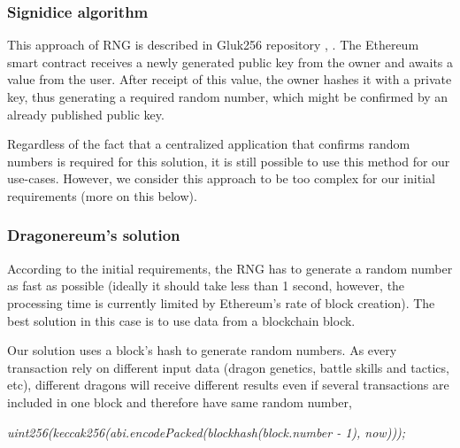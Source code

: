 \documentclass[12pt]{article}
\begin{document}
\vspace{\baselineskip}
\subsubsection{Signidice algorithm}\label{Signidice algorithm}  \par

This approach of RNG is described in Gluk256 repository  \cite{Dao_Casino_Ksenya_Serova_2017_Jun_27},  \cite{Gluk256_2016_Aug_26}. The Ethereum smart contract receives a newly generated public key from the owner and awaits a value from the user. After receipt of this value, the owner hashes it with a private key, thus generating a required random number, which might be confirmed by an already published public key.\par

Regardless of the fact that a centralized application that confirms random numbers is required for this solution, it is still possible to use this method for our use-cases. However, we consider this approach to be too complex for our initial requirements (more on this below).\par


\vspace{\baselineskip}
\subsubsection{Dragonereum’s solution}\label{Dragonereums solution}  \par

According to the initial requirements, the RNG has to generate a random number as fast as possible (ideally it should take less than 1 second, however, the processing time is currently limited by Ethereum’s rate of block creation). The best solution in this case is to use data from a blockchain block.\par

Our solution uses a block’s hash to generate random numbers. As every transaction rely on different input data (dragon genetics, battle skills and tactics, etc), different dragons will receive different results even if several transactions are included in one block and therefore have same random number,\par

\begin{Center}
\textit{uint256(keccak256(abi.encodePacked(blockhash(block.number - 1), now)));}
\end{Center}\par
\end{document}
